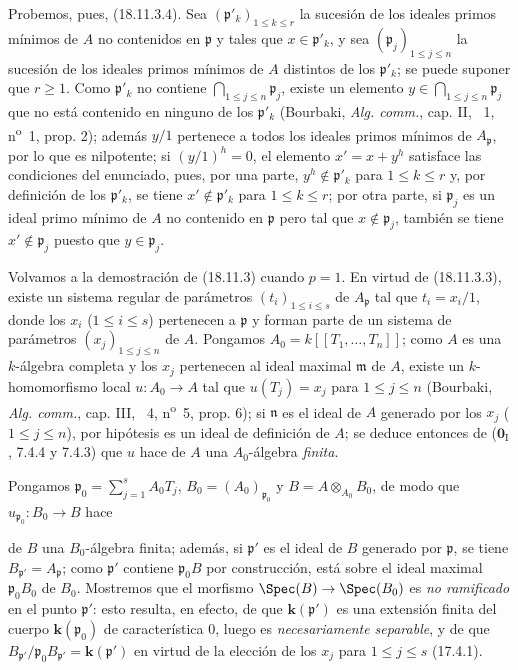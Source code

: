 Probemos, pues, (18.11.3.4). Sea $(\mathfrak p'_k)_{1\leq k\leq r}$ la sucesión de los ideales primos mínimos de $A$ no contenidos en $\mathfrak p$ y tales que $x\in\mathfrak p'_k$, y sea $(\mathfrak p_j)_{1\leq j\leq n}$ la sucesión de los ideales primos mínimos de $A$ distintos de los $\mathfrak p'_k$; se puede suponer que $r\geq1$. Como $\mathfrak p'_k$ no contiene $\bigcap_{1\leq j\leq n}\mathfrak p_j$, existe un elemento $y\in\bigcap_{1\leq j\leq n}\mathfrak p_j$ que no está contenido en ninguno de los $\mathfrak p'_k$ (Bourbaki, \emph{Alg. comm.}, cap. II, \textsection~1, n\textsuperscript{o}~1, prop. 2); además $y/1$ pertenece a todos los ideales primos mínimos de $A_{\mathfrak p}$, por lo que es nilpotente; si $(y/1)^h=0$, el elemento $x'=x+y^h$ satisface las condiciones del enunciado, pues, por una parte, $y^h\notin\mathfrak p'_k$ para $1\leq k\leq r$ y, por definición de los $\mathfrak p'_k$, se tiene $x'\notin\mathfrak p'_k$ para $1\leq k\leq r$; por otra parte, si $\mathfrak p_j$ es un ideal primo mínimo de $A$ no contenido en $\mathfrak p$ pero tal que $x\notin\mathfrak p_j$, también se tiene $x'\notin\mathfrak p_j$ puesto que $y\in\mathfrak p_j$.

Volvamos a la demostración de (18.11.3) cuando $p=1$. En virtud de (18.11.3.3), existe un sistema regular de parámetros $(t_i)_{1\leq i\leq s}$ de $A_{\mathfrak p}$ tal que $t_i=x_i/1$, donde los $x_i$ ($1\leq i\leq s$) pertenecen a $\mathfrak p$ y forman parte de un sistema de parámetros $(x_j)_{1\leq j\leq n}$ de $A$. Pongamos $A_0=k[[T_1,\ldots,T_n]]$; como $A$ es una $k$-álgebra completa y los $x_j$ pertenecen al ideal maximal $\mathfrak m$ de $A$, existe un $k$-homomorfismo local $u:A_0\to A$ tal que $u(T_j)=x_j$ para $1\leq j\leq n$ (Bourbaki, \emph{Alg. comm.}, cap. III, \textsection~4, n\textsuperscript{o}~5, prop. 6); si $\mathfrak n$ es el ideal de $A$ generado por los $x_j$ ($1\leq j\leq n$), por hipótesis es un ideal de definición de $A$; se deduce entonces de ($\mathbf{0}_{\mathrm I}$, 7.4.4 y 7.4.3) que $u$ hace de $A$ una $A_0$-álgebra \emph{finita}.

Pongamos $\mathfrak p_0=\sum_{j=1}^s A_0T_j$, $B_0=(A_0)_{\mathfrak p_0}$ y $B=A\otimes_{A_0}B_0$, de modo que $u_{\mathfrak p_0}:B_0\to B$ hace


de $B$ una $B_0$-álgebra finita; además, si $\mathfrak p'$ es el ideal de $B$ generado por $\mathfrak p$, se tiene $B_{\mathfrak p'}=A_{\mathfrak p}$; como $\mathfrak p'$ contiene $\mathfrak p_0B$ por construcción, está sobre el ideal maximal $\mathfrak p_0B_0$ de $B_0$. Mostremos que el morfismo $\Spec(B)\to\Spec(B_0)$ es \emph{no ramificado} en el punto $\mathfrak p'$: esto resulta, en efecto, de que $\boldsymbol{k}(\mathfrak p')$ es una extensión finita del cuerpo $\boldsymbol{k}(\mathfrak p_0)$ de característica 0, luego es \emph{necesariamente separable}, y de que $B_{\mathfrak p'}/\mathfrak p_0B_{\mathfrak p'}=\boldsymbol{k}(\mathfrak p')$ en virtud de la elección de los $x_j$ para $1\leq j\leq s$ (17.4.1).

